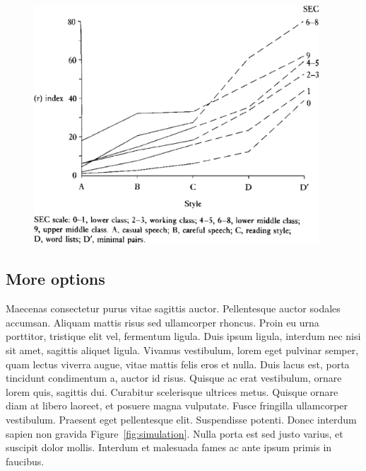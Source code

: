 \documentclass[10pt]{article}
\begin{document}
\begin{figure}[h]
\includegraphics[width=0.95\textwidth]{LabovGraph.pdf}
\end{figure}

\subsection{More options}

Maecenas consectetur purus vitae sagittis auctor. Pellentesque auctor sodales accumsan. Aliquam mattis risus sed ullamcorper rhoncus. Proin eu urna porttitor, tristique elit vel, fermentum ligula. Duis ipsum ligula, interdum nec nisi sit amet, sagittis aliquet ligula. Vivamus vestibulum, lorem eget pulvinar semper, quam lectus viverra augue, vitae mattis felis eros et nulla. Duis lacus est, porta tincidunt condimentum a, auctor id risus. Quisque ac erat vestibulum, ornare lorem quis, sagittis dui. Curabitur scelerisque ultrices metus. Quisque ornare diam at libero laoreet, et posuere magna vulputate. Fusce fringilla ullamcorper vestibulum. Praesent eget pellentesque elit. Suspendisse potenti. Donec interdum sapien non gravida 
Figure~\ref{fig:simulation}. Nulla porta est sed justo varius, et suscipit dolor mollis. Interdum et malesuada fames ac ante ipsum primis in faucibus.
\end{document}

